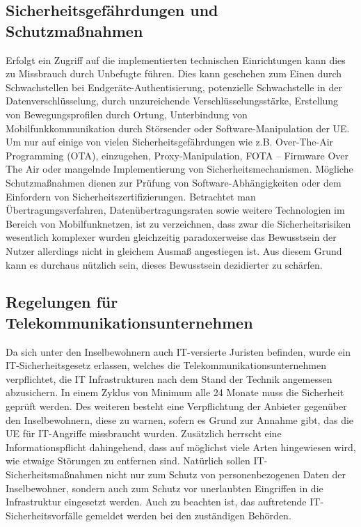 \subsection{Sicherheitsgefährdungen und Schutzmaßnahmen}
Erfolgt ein Zugriff auf die implementierten technischen Einrichtungen kann dies zu Missbrauch durch Unbefugte führen. Dies kann geschehen zum Einen durch Schwachstellen bei Endgeräte-Authentisierung, potenzielle Schwachstelle in der Datenverschlüsselung, durch unzureichende Verschlüsselungsstärke, Erstellung von Bewegungsprofilen durch Ortung, Unterbindung von Mobilfunkkommunikation durch Störsender oder Software-Manipulation der UE. Um nur auf einige von vielen Sicherheitsgefährdungen wie z.B. Over-The-Air Programming (OTA), einzugehen, Proxy-Manipulation, FOTA – Firmware Over The Air oder mangelnde Implementierung von Sicherheitsmechanismen. Mögliche Schutzmaßnahmen dienen zur Prüfung von Software-Abhängigkeiten oder dem Einfordern von Sicherheitszertifizierungen. 
Betrachtet man Übertragungsverfahren, Datenübertragungsraten sowie weitere Technologien im Bereich von Mobilfunknetzen, ist zu verzeichnen, dass zwar die Sicherheitsrisiken wesentlich komplexer wurden gleichzeitig paradoxerweise das Bewusstsein der Nutzer allerdings nicht in gleichem Ausmaß angestiegen ist. Aus diesem Grund kann es durchaus nützlich sein, dieses Bewusstsein dezidierter zu schärfen\cite{Ger08}.

\subsection{Regelungen für Telekommunikationsunternehmen}

Da sich unter den Inselbewohnern auch IT-versierte Juristen befinden, wurde ein IT-Sicherheitsgesetz erlassen, welches die Telekommunikationsunternehmen verpflichtet, die IT Infrastrukturen nach dem Stand der Technik angemessen abzusichern. In einem Zyklus von Minimum alle 24 Monate muss die Sicherheit geprüft werden.
Des weiteren besteht eine Verpflichtung der Anbieter gegenüber den Inselbewohnern, diese zu warnen, sofern es Grund zur Annahme gibt, das die UE für IT-Angriffe missbraucht wurden. Zusätzlich herrscht eine Informationspflicht dahingehend, dass auf möglichst viele Arten hingewiesen wird, wie etwaige Störungen zu entfernen sind.
Natürlich sollen IT-Sicherheitsmaßnahmen nicht nur zum Schutz von personenbezogenen Daten der Inselbewohner, sondern auch zum Schutz vor unerlaubten Eingriffen in die Infrastruktur eingesetzt werden.
Auch zu beachten ist, das auftretende IT-Sicherheitsvorfälle gemeldet werden bei den zuständigen Behörden.\cite{BSI17}  